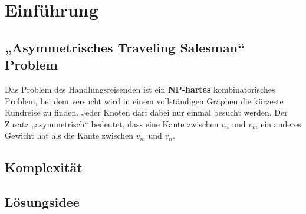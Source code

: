 \section{Einführung}
\subsection{„Asymmetrisches Traveling Salesman“ Problem}
Das Problem des Handlungsreisenden ist ein
\textbf{NP-hartes} kombinatorisches Problem, bei dem versucht wird in
einem vollständigen Graphen die kürzeste Rundreise zu finden. Jeder
Knoten darf dabei nur einmal besucht werden. Der Zusatz „asymmetrisch“
bedeutet, dass eine Kante zwischen $v_n$ und $v_m$ ein anderes Gewicht
hat als die Kante zwischen $v_m$ und $v_n$.

\subsection{Komplexität}

\subsection{Lösungsidee}
